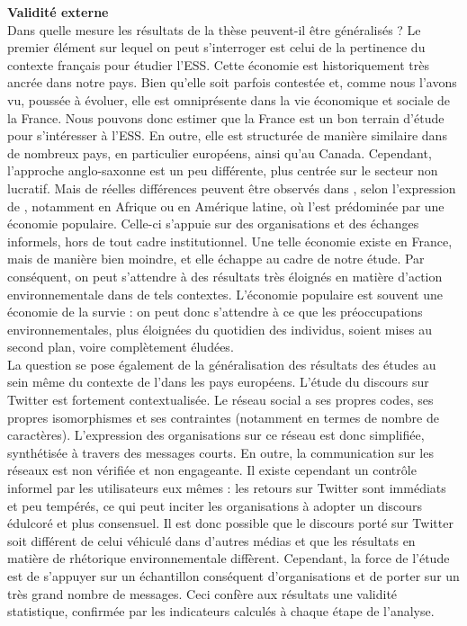         \textbf{Validité externe} \\
        Dans quelle mesure les résultats de la thèse peuvent-il être généralisés ? Le premier élément sur lequel on peut s'interroger est celui de la pertinence du contexte français pour étudier l'ESS. Cette économie est historiquement très ancrée dans notre pays. Bien qu'elle soit parfois contestée et, comme nous l'avons vu, poussée à évoluer, elle est omniprésente dans la vie économique et sociale de la France. Nous pouvons donc estimer que la France est un bon terrain d'étude pour s'intéresser à l'ESS. En outre, elle est structurée de manière similaire dans de nombreux pays, en particulier européens, ainsi qu'au Canada. Cependant, l'approche anglo-saxonne est un peu différente, plus centrée sur le secteur non lucratif. Mais de réelles différences peuvent être observés dans , selon l'expression de \textcite{laville2016economie}, notamment en Afrique ou en Amérique latine, où l'\ess est prédominée par une économie populaire. Celle-ci s'appuie sur des organisations et des échanges informels, hors de tout cadre institutionnel. Une telle économie existe en France, mais de manière bien moindre, et elle échappe au cadre de notre étude. Par conséquent, on peut s'attendre à des résultats très éloignés en matière d'action environnementale dans de tels contextes. L'économie populaire est souvent une économie de la survie : on peut donc s'attendre à ce que les préoccupations environnementales, plus éloignées du quotidien des individus, soient mises au second plan, voire complètement éludées. \\

        La question se pose également de la généralisation des résultats des études au sein même du contexte de l'\ess dans les pays européens. L'étude du discours sur Twitter est fortement contextualisée. Le réseau social a ses propres codes, ses propres isomorphismes et ses contraintes (notamment en termes de nombre de caractères). L'expression des organisations sur ce réseau est donc simplifiée, synthétisée à travers des messages courts. En outre, la communication sur les réseaux est non vérifiée et non engageante. Il existe cependant un contrôle informel par les utilisateurs eux mêmes : les retours sur Twitter sont immédiats et peu tempérés, ce qui peut inciter les organisations à adopter un discours édulcoré et plus consensuel. Il est donc possible que le discours porté sur Twitter soit différent de celui véhiculé dans d'autres médias et que les résultats en matière de rhétorique environnementale diffèrent. Cependant, la force de l'étude est de s'appuyer sur un échantillon conséquent d'organisations et de porter sur un très grand nombre de messages. Ceci confère aux résultats une validité statistique, confirmée par les indicateurs calculés à chaque étape de l'analyse. \\

